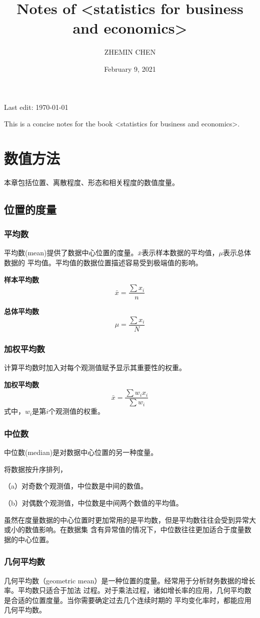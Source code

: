 \documentclass[a4paper]{ctexrep}
\title{Notes of <statistics for business and economics>}  %
\author{ZHEMIN CHEN}   %
\date{February 9, 2021}   %
\begin{document}
\maketitle
\noindent
Last edit: \today

This is a concise notes for the book <statistics for business and economics>.

\tableofcontents
\clearpage

\chapter{数值方法}
本章包括位置、离散程度、形态和相关程度的数值度量。

\section{位置的度量}

\subsection{平均数}
平均数(mean)提供了数据中心位置的度量。$\bar{x}$表示样本数据的平均值，$\mu$表示总体数据的
平均值。平均值的数据位置描述容易受到极端值的影响。

\textbf{样本平均数}
\[\bar{x}=\frac{\sum x_{i}}{n}\]

\textbf{总体平均数}
\[\mu =\frac{\sum x_{i}}{N}\]

\subsection{加权平均数}
计算平均数时加入对每个观测值赋予显示其重要性的权重。

\textbf{加权平均数}
\[\bar{x}=\frac{\sum w_{i}x_{i}}{\sum w_{i}}\]
式中，$w_{i}$是第$i$个观测值的权重。

\subsection{中位数}
中位数(median)是对数据中心位置的另一种度量。

将数据按升序排列，

（a）对奇数个观测值，中位数是中间的数值。

（b）对偶数个观测值，中位数是中间两个数值的平均值。

虽然在度量数据的中心位置时更加常用的是平均数，但是平均数往往会受到异常大或小的数值影响。在数据集
含有异常值的情况下，中位数往往更加适合于度量数据的中心位置。

\subsection{几何平均数}
几何平均数（geometric mean）是一种位置的度量。经常用于分析财务数据的增长率。平均数只适合于加法
过程。对于乘法过程，诸如增长率的应用，几何平均数是合适的位置度量。当你需要确定过去几个连续时期的
平均变化率时，都能应用几何平均数。
\end{document}
